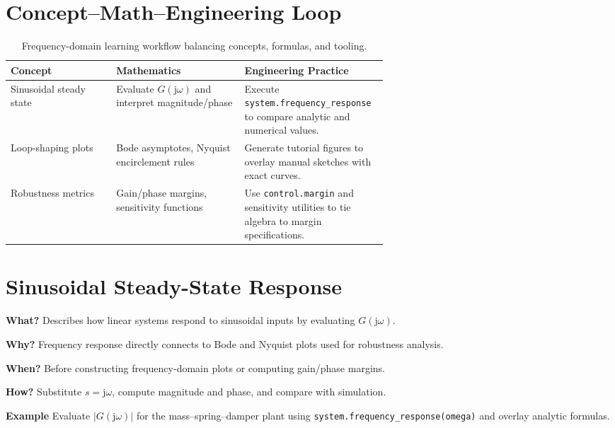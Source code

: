 \section{Concept--Math--Engineering Loop}
\begin{table}[h]
    \centering
    \small
    \renewcommand{\arraystretch}{1.2}
    \begin{tabularx}{\linewidth}{|>{\raggedright\arraybackslash}p{0.28\linewidth}|>{\raggedright\arraybackslash}p{0.34\linewidth}|>{\raggedright\arraybackslash}X|}
        \hline
        \textbf{Concept} & \textbf{Mathematics} & \textbf{Engineering Practice} \\
        \hline
        Sinusoidal steady state & Evaluate $G(\mathrm{j}\omega)$ and interpret magnitude/phase & Execute \texttt{system.frequency\_response} to compare analytic and numerical values. \\
        \hline
        Loop-shaping plots & Bode asymptotes, Nyquist encirclement rules & Generate tutorial figures to overlay manual sketches with exact curves. \\
        \hline
        Robustness metrics & Gain/phase margins, sensitivity functions & Use \texttt{control.margin} and sensitivity utilities to tie algebra to margin specifications. \\
        \hline
    \end{tabularx}
    \caption{Frequency-domain learning workflow balancing concepts, formulas, and tooling.}
\end{table}

\section{Sinusoidal Steady-State Response}
\begin{beginnerguide}
    \item[\textbf{What?}] Describes how linear systems respond to sinusoidal inputs by evaluating $G(\mathrm{j}\omega)$.
    \item[\textbf{Why?}] Frequency response directly connects to Bode and Nyquist plots used for robustness analysis.
    \item[\textbf{When?}] Before constructing frequency-domain plots or computing gain/phase margins.
    \item[\textbf{How?}] Substitute $s=\mathrm{j}\omega$, compute magnitude and phase, and compare with simulation.
    \item[\textbf{Example}] Evaluate $|G(\mathrm{j}\omega)|$ for the mass--spring--damper plant using \texttt{system.frequency\_response(omega)} and overlay analytic formulas.
\end{beginnerguide}
